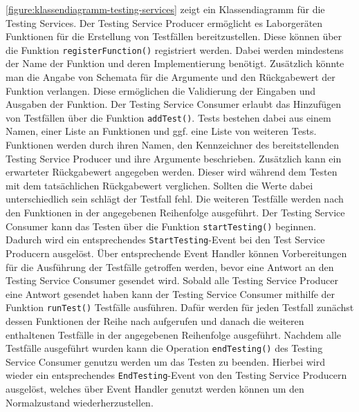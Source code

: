 \autoref{figure:klassendiagramm-testing-services} zeigt ein Klassendiagramm für die Testing Services. Der Testing Service Producer ermöglicht es Laborgeräten Funktionen für die Erstellung von Testfällen bereitzustellen. Diese können über die Funktion \texttt{registerFunction()} registriert werden. Dabei werden mindestens der Name der Funktion und deren Implementierung benötigt. Zusätzlich könnte man die Angabe von Schemata für die Argumente und den Rückgabewert der Funktion verlangen. Diese ermöglichen die Validierung der Eingaben und Ausgaben der Funktion. Der Testing Service Consumer erlaubt das Hinzufügen von Testfällen über die Funktion \texttt{addTest()}. Tests bestehen dabei aus einem Namen, einer Liste an Funktionen und ggf. eine Liste von weiteren Tests. Funktionen werden durch ihren Namen, den Kennzeichner des bereitstellenden Testing Service Producer und ihre Argumente beschrieben. Zusätzlich kann ein erwarteter Rückgabewert angegeben werden. Dieser wird während dem Testen mit dem tatsächlichen Rückgabewert verglichen. Sollten die Werte dabei unterschiedlich sein schlägt der Testfall fehl. Die weiteren Testfälle werden nach den Funktionen in der angegebenen Reihenfolge ausgeführt. Der Testing Service Consumer kann das Testen über die Funktion \texttt{startTesting()} beginnen. Dadurch wird ein entsprechendes \texttt{StartTesting}-Event bei den Test Service Producern ausgelöst. Über entsprechende Event Handler können Vorbereitungen für die Ausführung der Testfälle getroffen werden, bevor eine Antwort an den Testing Service Consumer gesendet wird. Sobald alle Testing Service Producer eine Antwort gesendet haben kann der Testing Service Consumer mithilfe der Funktion \texttt{runTest()} Testfälle ausführen. Dafür werden für jeden Testfall zunächst dessen Funktionen der Reihe nach aufgerufen und danach die weiteren enthaltenen Testfälle in der angegebenen Reihenfolge ausgeführt. Nachdem alle Testfälle ausgeführt wurden kann die Operation \texttt{endTesting()} des Testing Service Consumer genutzu werden um das Testen zu beenden. Hierbei wird wieder ein entsprechendes \texttt{EndTesting}-Event von den Testing Service Producern ausgelöst, welches über Event Handler genutzt werden können um den Normalzustand wiederherzustellen.


